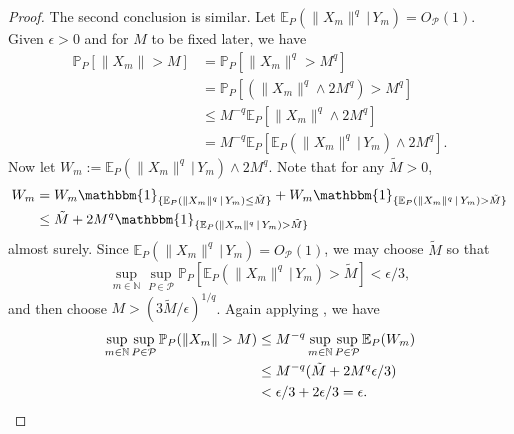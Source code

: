 \documentclass[aos]{imsart}
\newcommand{\ind}{\mathbbm{1}}
\renewcommand{\Pr}{\mathbb{P}}
\newcommand{\E}{\mathbb{E}}
\newcommand{\given}{\,|\,}
\begin{document}
\begin{proof}
		The second conclusion is similar. Let $\E_P(\|X_m\|^q\given  Y_m) = O_{\mathcal{P}}(1)$. Given $\epsilon>0$ and for $M$ to be fixed later, we have
		\begin{align*}
			\Pr_P[\|X_m\|>M] &= \Pr_P[\|X_m\|^q>M^q]\\
			&= \Pr_P[(\|X_m\|^q\wedge 2M^q)>M^q]\\
			&\leq M^{-q} \E_P[\|X_m\|^q\wedge 2M^q]\\
			&= M^{-q} \E_P[\E_P(\|X_m\|^q\given  Y_m) \wedge 2M^q].
		\end{align*}
		Now let $W_m:= \E_P(\|X_m\|^q\given  Y_m) \wedge 2M^q$. Note that for any $\tilde M>0$,
		\begin{align*}
			W_m &= W_m \ind_{\{\E_P(\|X_m\|^q\given  Y_m)\leq \tilde M\}} + W_m \ind_{\{\E_P(\|X_m\|^q\given  Y_m)> \tilde M\}}\\
			&\leq \tilde M + 2M^q \ind_{\{\E_P(\|X_m\|^q\given  Y_m)> \tilde M\}}
		\end{align*}
		almost surely. Since $\E_P(\|X_m\|^q\given  Y_m) = O_{\mathcal{P}}(1)$, we may choose $\tilde M$ so that \begin{equation*}
			\sup_{m\in\mathbb{N}} \sup_{P\in\mathcal{P}} \Pr_P[\E_P(\|X_m\|^q\given  Y_m)>\tilde M] < \epsilon/3,
		\end{equation*}
		and then choose $M>(3\tilde M/\epsilon)^{1/q}$. Again applying \citet[Supp. Lem.~25]{ShahGCM}, we have \begin{align*}
			\sup_{m\in\mathbb{N}} \sup_{P\in\mathcal{P}} \Pr_P(\|X_m\|>M) &\leq M^{-q} \sup_{m\in\mathbb{N}}\sup_{P\in\mathcal{P}} \E_P(W_m)\\
			&\leq M^{-q}(\tilde M + 2M^q \epsilon/3)\\
			&<\epsilon/3 + 2\epsilon/3 = \epsilon. \qedhere
		\end{align*}
	\end{proof}
	
	
\end{document}
